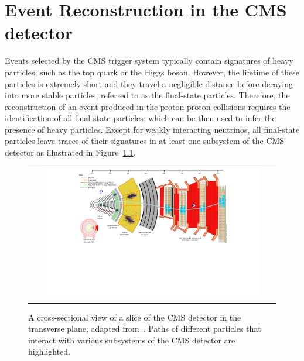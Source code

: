\chapter{Event Reconstruction in the CMS detector}
\label{chap:Event}

Events selected by the \ac{CMS} trigger system typically contain signatures of heavy particles, such as the top quark or the Higgs boson. However, the lifetime of these particles is extremely short and they travel a negligible distance before decaying into more stable particles, referred to as the final-state particles. Therefore, the reconstruction of an event produced in the proton-proton collisions requires the identification of all final state particles, which can be then used to infer the presence of heavy particles. Except for weakly interacting neutrinos, all final-state particles leave traces of their signatures in at least one subsystem of the \ac{CMS} detector as illustrated in Figure~\ref{fig:PF}.

\begin{figure}[tbh!]
 \begin{center}
 \begin{tabular}{c}
 \includegraphics[width=0.9\textwidth]{figures/Part2/Event/PF}
 \end{tabular}
 \caption{A cross-sectional view of a slice of the \ac{CMS} detector in the transverse plane, adapted from~\cite{Barney:2018}. Paths of different particles that interact with various subsystems of the \ac{CMS} detector are highlighted.}
 \label{fig:PF}
 \end{center}
\end{figure}

